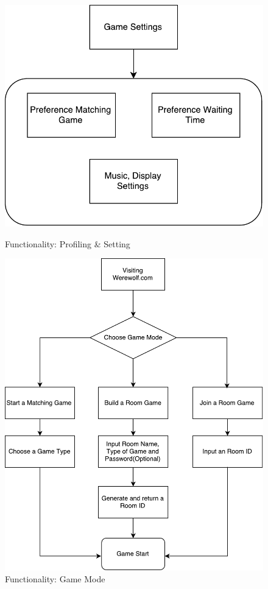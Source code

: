 \documentclass[11pt]{article}
\begin{document}
\begin{figure}
\centering
\begin{minipage}{.5\linewidth}
\centering
\includegraphics[width=.9\linewidth]{func-settings.pdf}
\caption{Functionality: Profiling \& Setting}
\label{fig:func-settings}
\end{minipage}%
\begin{minipage}{.5\linewidth}
\centering
\includegraphics[width=.9\linewidth]{func-index.pdf}
\caption{Functionality: Game Mode}
\label{fig:func-index}
\end{minipage}
\end{figure}
\end{document}
